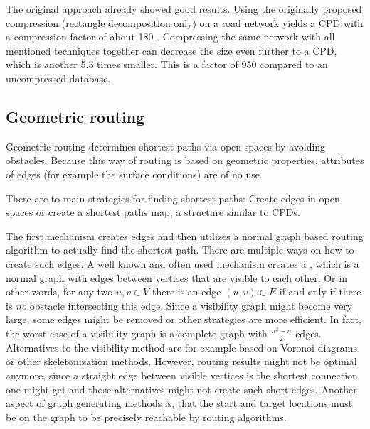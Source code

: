 			The original approach already showed good results.
			Using the originally proposed compression (rectangle decomposition only) on a road network yields a CPD with a compression factor of about 180 \cite[4]{botea-cpd-2013}.
			Compressing the same network with all mentioned techniques together can decrease the size even further to a CPD, which is another 5.3 times smaller.
			This is a factor of 950 compared to an uncompressed database.
	
	\subsection{Geometric routing}
	\label{subsec:geometric-routing}
	
		Geometric routing determines shortest paths via open spaces by avoiding obstacles.
		Because this way of routing is based on geometric properties, attributes of edges (for example the surface conditions) are of no use.
		
		
		There are to main strategies for finding shortest paths:
		Create edges in open spaces or create a shortest paths map, a structure similar to CPDs.
		
		The first mechanism creates edges and then utilizes a normal graph based routing algorithm to actually find the shortest path.
		There are multiple ways on how to create such edges.
		A well known and often used mechanism creates a , which is a normal graph with edges between vertices that are visible to each other.
		Or in other words, for any two $u, v \in V$ there is an edge $(u, v) \in E$ if and only if there is \textit{no} obstacle intersecting this edge.
		Since a visibility graph might become very large, some edges might be removed or other strategies are more efficient.
		In fact, the worst-case of a visibility graph is a complete graph with $\frac{n^2 - n}{2}$ edges.
		Alternatives to the visibility method are for example based on Voronoi diagrams or other skeletonization methods\cite[219-220]{graser-osm-open-spaces}.
		However, routing results might not be optimal anymore, since a straight edge between visible vertices is the shortest connection one might get and those alternatives might not create such short edges\cite[223]{graser-osm-open-spaces}.
		Another aspect of graph generating methods is, that the start and target locations must be on the graph to be precisely reachable by routing algorithms.
		
